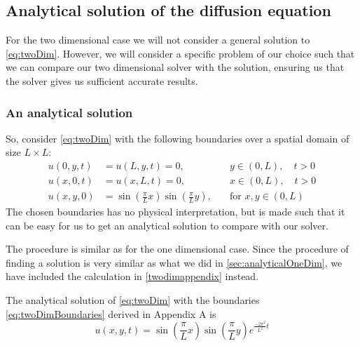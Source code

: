\subsection{Analytical solution of the diffusion equation}
For the two dimensional case we will not consider a general solution to \vref{eq:twoDim}. However, we will consider a specific problem of our choice such that we can compare our two dimensional solver with the solution, ensuring us that the solver gives us sufficient accurate results.
\subsubsection{An analytical solution}
So, consider \vref{eq:twoDim} with the following boundaries over a spatial domain of size \(L \times L\):
\begin{equation} \label{eq:twoDimBoundaries}
\begin{aligned}
u(0,y,t) &= u(L,y,t) = 0, \quad &y \in (0,L),\quad t > 0 \\
u(x,0,t) &= u(x,L,t) = 0, \quad &x \in (0,L),\quad t > 0 \\
u(x,y,0) &= \sin(\frac{\pi}{L}x)\sin(\frac{\pi}{L}y), \quad&\text{for }x,y\in (0,L)
\end{aligned}
\end{equation}
The chosen boundaries has no physical interpretation, but is made such that it can be easy for us to get an analytical solution to compare with our solver.

The procedure is similar as for the one dimensional case. Since the procedure of finding a solution is very similar as what we did in \vref{sec:analyticalOneDim}, we have included the calculation in \ref{twodimappendix} instead.

The analytical solution of \vref{eq:twoDim} with the boundaries \vref{eq:twoDimBoundaries} derived in Appendix A is
\begin{equation} \label{eq:analyticalSolutionTwoDim}
u(x,y,t) = \sin(\frac{\pi}{L}x)\sin(\frac{\pi}{L}y)e^{\frac{-2\pi^2}{L^2}t}
\end{equation}
